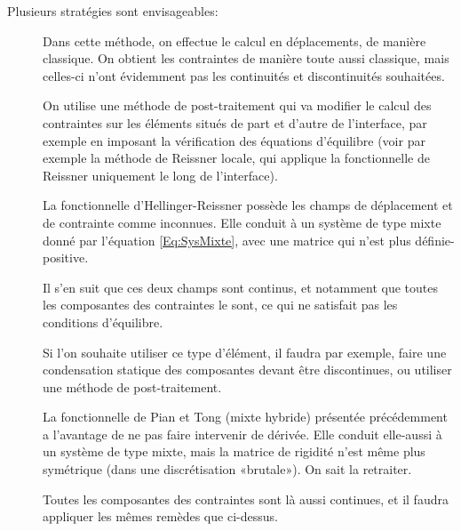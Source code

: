 \bigskip
Plusieurs stratégies sont envisageables:
\begin{description}
\item[]

	Dans cette méthode, on effectue le calcul en déplacements, de manière classique. 	On obtient les contraintes de manière toute aussi classique, mais celles-ci 	n'ont évidemment pas les continuités et discontinuités souhaitées.

	On utilise une méthode de post-traitement qui va modifier le calcul des contraintes 	sur les éléments situés de part et d'autre de l'interface, par exemple 	en imposant la vérification des équations d'équilibre (voir par exemple 	la méthode de Reissner locale, qui applique la fonctionnelle de Reissner uniquement 	le long de l'interface).\item[]

	La fonctionnelle d'Hellinger-Reissner possède les champs de déplacement et de 	contrainte comme inconnues. Elle conduit à un système de type mixte donné par l'équation \eqref{Eq:SysMixte}, avec une matrice qui n'est plus définie-positive.

	Il s'en suit que ces deux champs sont continus, et notamment que toutes les 	composantes des contraintes le sont, ce qui ne satisfait pas les conditions d'équilibre.

	Si l'on souhaite utiliser ce type d'élément, il faudra par exemple, faire une condensation statique des composantes devant être discontinues, ou utiliser une méthode de post-traitement.

	\item[]

	La fonctionnelle de Pian et Tong (mixte hybride) présentée précédemment a l'avantage de ne pas faire intervenir de dérivée. Elle conduit elle-aussi à un système de type mixte, mais la matrice de rigidité n'est même plus symétrique (dans une discrétisation «brutale»). On sait la retraiter.

	Toutes les composantes des contraintes sont là aussi continues, et il faudra appliquer les mêmes remèdes que ci-dessus.


\end{description}
